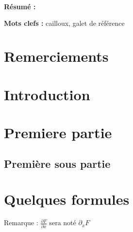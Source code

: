 \documentclass[10pt,a4paper]{article}
\numberwithin{equation}{section}
\begin{document}
\begin{titlepage}
\textbf{Résumé :} 
\vspace{0.3cm}

\textbf{Mots clefs :} cailloux, galet de référence
\vspace{0.3cm}


\end{titlepage}

\newpage

\renewcommand\thepage{}

\section*{Remerciements}




\tableofcontents


\newpage
\renewcommand\thepage{\arabic{page}}
\setcounter{page}{1}



\section*{Introduction}


\newpage
\section{Premiere partie}

\subsection{Première sous partie}



\section{Quelques formules}
Remarque : $\frac{\partial F}{\partial x}$ sera noté $\partial_x F$
\end{document}
